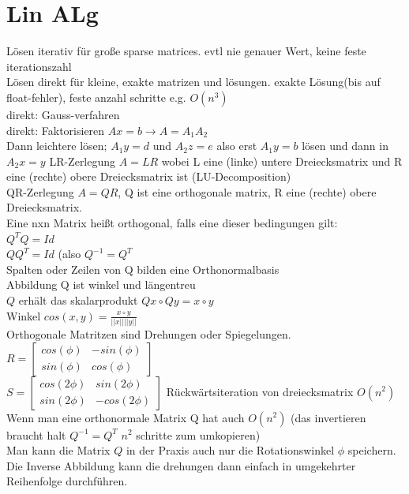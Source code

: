 \documentclass{article}
\begin{document}
	\section{Lin ALg}
	Lösen iterativ für große sparse matrices. evtl nie genauer Wert, keine feste iterationszahl\\
	Lösen direkt für kleine, exakte matrizen und lösungen. exakte Lösung(bis auf float-fehler), feste anzahl schritte e.g. $O(n^3)$\\
	direkt: Gauss-verfahren\\
	direkt: Faktorisieren $Ax=b\to A=A_1A_2$\\
	Dann leichtere lösen; $A_1y=d$ und $A_2 z=e$ also erst $A_1y=b$ lösen und dann in $A_2 x=y$
	LR-Zerlegung $A=LR$ wobei L eine (linke) untere Dreiecksmatrix und R eine (rechte) obere Dreiecksmatrix ist (LU-Decomposition)\\
	QR-Zerlegung $A=QR$, Q ist eine orthogonale matrix, R eine (rechte) obere Dreiecksmatrix.\\
	Eine nxn Matrix heißt orthogonal, falls eine dieser bedingungen gilt:\\
	$Q^TQ=Id$\\
	$QQ^T =Id$ (also $Q^{-1} =Q^T$\\
	Spalten oder Zeilen von Q bilden eine Orthonormalbasis\\
	Abbildung Q ist winkel und längentreu\\
	$Q$ erhält das skalarprodukt $Qx\circ Qy = x\circ y$\\
	Winkel $cos(x,y) = \frac{x\circ y}{||x|| ||y||}$\\
	Orthogonale Matritzen sind Drehungen oder Spiegelungen.\\
	$R=\begin{bmatrix} cos(\phi) &-sin(\phi)\\sin(\phi)&cos(\phi)\end{bmatrix}$\\
	$S = \begin{bmatrix} cos(2\phi) &sin(2\phi)\\sin(2\phi)&-cos(2\phi)\end{bmatrix}$
	Rückwärtsiteration von dreiecksmatrix $O(n^2)$\\
	Wenn man eine orthonormale Matrix Q hat auch $O(n^2)$ (das invertieren braucht halt $Q^{-1}=Q^T$ $n^2$ schritte zum umkopieren)\\
	Man kann die Matrix $Q$ in der Praxis auch nur die Rotationswinkel $\phi$ speichern.\\
	Die Inverse Abbildung kann die drehungen dann einfach in umgekehrter Reihenfolge durchführen.\\
\end{document}
